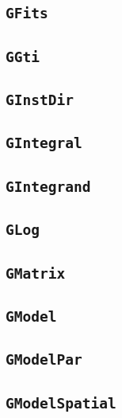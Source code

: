\documentclass{article}[12pt,a4]
\begin{document}
\subsection{{\tt GFits}}

\subsection{{\tt GGti}}

\subsection{{\tt GInstDir}}

\subsection{{\tt GIntegral}}

\subsection{{\tt GIntegrand}}

\subsection{{\tt GLog}}

\subsection{{\tt GMatrix}}

\subsection{{\tt GModel}}

\subsection{{\tt GModelPar}}

\subsection{{\tt GModelSpatial}}
\end{document}
